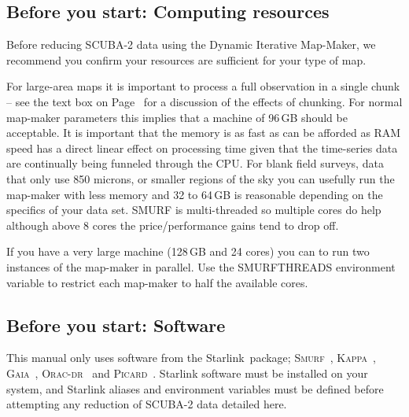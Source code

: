 \documentclass[twoside,11pt]{article}
\newcommand{\htmladdnormallink}[2]{#1}
\newcommand{\htmlref}[2]{#1}
\newcommand{\latexhtml}[2]{#1}
\newcommand{\xref}[3]{#1}
\newcommand{\xlabel}[1]{}
\renewcommand{\_}{\texttt{\symbol{95}}}
\newcommand{\starlink}{\htmladdnormallink{Starlink}{http://starlink.jach.hawaii.edu}}
\newcommand{\gaia}{\xref{\textsc{Gaia}}{sun214}{}}
\newcommand{\Kappa}{\xref{\textsc{Kappa}}{sun95}{}}
\newcommand{\oracdr}{\htmladdnormallink{\textsc{Orac-dr}}{http://www.oracdr.org/oracdr}}
\newcommand{\picard}{\xref{\textsc{Picard}}{sun265}{}}
\newcommand{\smurf}{\xref{\textsc{Smurf}}{sun258}{}}
\begin{document}
\subsection{\xlabel{computing}Before you start: Computing resources}

Before reducing SCUBA-2 data using the Dynamic Iterative Map-Maker, we
recommend you confirm your resources are sufficient for your type of
map.

For large-area maps it is important to process a full observation in a
single chunk -- see the text box on
\latexhtml{Page~\pageref{page:text}}{\htmlref{What to look
for}{box:chunk}} for a
discussion of the effects of chunking. For normal map-maker parameters
this implies that a machine of 96\,GB should be acceptable. It is
important that the memory is as fast as can be afforded as RAM speed
has a direct linear effect on processing time given that the
time-series data are continually being funneled through the CPU. For
blank field surveys, data that only use 850 microns, or smaller
regions of the sky you can usefully run the map-maker with less memory
and 32 to 64\,GB is reasonable depending on the specifics of your data
set. SMURF is multi-threaded so multiple cores do help although above
8 cores the price/performance gains tend to drop off.

If you have a very large machine (128\,GB and 24 cores) you can to run
two instances of the map-maker in parallel. Use the SMURF\_THREADS
environment variable to restrict each map-maker to half the available
cores.


\subsection{\xlabel{software}Before you start: Software}

This manual only uses software from the \starlink\ package;
\smurf\ \cite{smurf}, \Kappa\ \cite{kappa}, \gaia\ \cite{gaia}, \oracdr\ \cite{oracdr} and
\picard\ \cite{picard}. Starlink software must be installed on your system, and Starlink aliases
and environment variables must be defined before attempting any
reduction of SCUBA-2 data detailed here.
\end{document}
